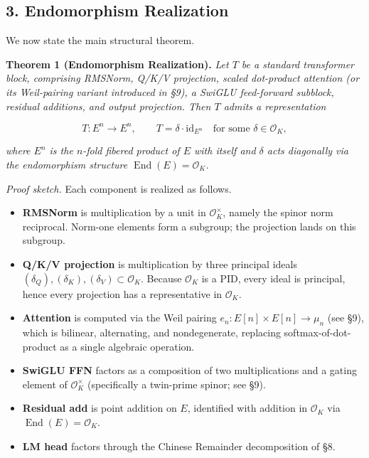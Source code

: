\documentclass[
  11pt,
]{article}
\providecommand{\tightlist}{%
  \setlength{\itemsep}{0pt}\setlength{\parskip}{0pt}}
\begin{document}
\hypertarget{endomorphism-realization}{%
\subsection{3. Endomorphism
Realization}\label{endomorphism-realization}}

We now state the main structural theorem.

\textbf{Theorem 1 (Endomorphism Realization).} \emph{Let \(T\) be a
standard transformer block, comprising RMSNorm, Q/K/V projection, scaled
dot-product attention (or its Weil-pairing variant introduced in §9), a
SwiGLU feed-forward subblock, residual additions, and output projection.
Then \(T\) admits a representation}

\[T : E^n \longrightarrow E^n, \qquad T = \delta \cdot \mathrm{id}_{E^n} \quad \text{for some } \delta \in \mathcal{O}_K,\]

\emph{where \(E^n\) is the \(n\)-fold fibered product of \(E\) with
itself and \(\delta\) acts diagonally via the endomorphism structure
\(\operatorname{End}(E) = \mathcal{O}_K\).}

\emph{Proof sketch.} Each component is realized as follows.

\begin{itemize}
\tightlist
\item
  \textbf{RMSNorm} is multiplication by a unit in
  \(\mathcal{O}_K^\times\), namely the spinor norm reciprocal. Norm-one
  elements form a subgroup; the projection lands on this subgroup.
\item
  \textbf{Q/K/V projection} is multiplication by three principal ideals
  \((\delta_Q), (\delta_K), (\delta_V) \subset \mathcal{O}_K\). Because
  \(\mathcal{O}_K\) is a PID, every ideal is principal, hence every
  projection has a representative in \(\mathcal{O}_K\).
\item
  \textbf{Attention} is computed via the Weil pairing
  \(e_n : E[n] \times E[n] \to \mu_n\) (see §9), which is bilinear,
  alternating, and nondegenerate, replacing softmax-of-dot-product as a
  single algebraic operation.
\item
  \textbf{SwiGLU FFN} factors as a composition of two multiplications
  and a gating element of \(\mathcal{O}_K^\times\) (specifically a
  twin-prime spinor; see §9).
\item
  \textbf{Residual add} is point addition on \(E\), identified with
  addition in \(\mathcal{O}_K\) via
  \(\operatorname{End}(E) = \mathcal{O}_K\).
\item
  \textbf{LM head} factors through the Chinese Remainder decomposition
  of §8.
\end{itemize}
\end{document}

